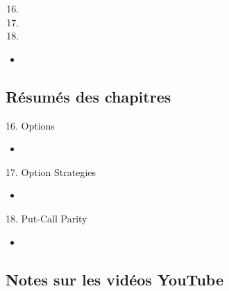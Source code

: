 \begin{ASM_chapter}
\begin{enumerate}
  \setcounter{enumi}{15}
	\item	{}
	\item	{}
	\item	{}
\end{enumerate}
\end{ASM_chapter}

\begin{YTB_vids}
\begin{itemize}
	\item	
\end{itemize}
\end{YTB_vids}

\subsection{Résumés des chapitres}

\begin{CHPT_SUMM_AUTO}[label = {L.-16}]{16. Options}
	\begin{itemize}
		\item	
	\end{itemize}
\end{CHPT_SUMM_AUTO}

\begin{CHPT_SUMM_AUTO}[label = {L.-17}]{17. Option Strategies}
	\begin{itemize}
		\item	
	\end{itemize}
\end{CHPT_SUMM_AUTO}

\begin{CHPT_SUMM_AUTO}[label = {L.-18}]{18. Put-Call Parity}
	\begin{itemize}
		\item	
	\end{itemize}
\end{CHPT_SUMM_AUTO}

\subsection{Notes sur les vidéos YouTube}

